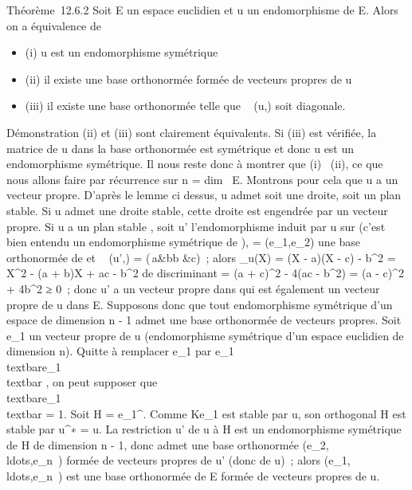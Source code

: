 \documentclass[]{article}
\begin{document}
Théorème~12.6.2 Soit E un espace euclidien et u un endomorphisme de E.
Alors on a équivalence de

\begin{itemize}
\itemsep1pt\parskip0pt
\item
  (i) u est un endomorphisme symétrique
\item
  (ii) il existe une base orthonormée formée de vecteurs propres de u
\item
  (iii) il existe une base orthonormée  telle que
  \mathrmMat~ (u,) soit
  diagonale.
\end{itemize}

Démonstration (ii) et (iii) sont clairement équivalents. Si (iii) est
vérifiée, la matrice de u dans la base orthonormée  est symétrique et
donc u est un endomorphisme symétrique. Il nous reste donc à montrer que
(i) \rigtharrow~(ii), ce que nous allons faire par récurrence sur n
= dim~ E. Montrons pour cela que u a un vecteur
propre. D'après le lemme ci dessus, u admet soit une droite, soit un
plan stable. Si u admet une droite stable, cette droite est engendrée
par un vecteur propre. Si u a un plan stable \Pi, soit u' l'endomorphisme
induit par u sur \Pi (c'est bien entendu un endomorphisme symétrique de
\Pi),  = (e\_1,e\_2) une base orthonormée de \Pi et
\mathrmMat~ (u',) =
\left
(\matrix\,a&b\cr b
&c\right )~; alors \chi\_u(X) = (X - a)(X - c) -
b^2 = X^2 - (a + b)X + ac - b^2 de
discriminant \Delta = (a + c)^2 - 4(ac - b^2) = (a -
c)^2 + 4b^2 ≥ 0~; donc u' a un vecteur propre dans \Pi
qui est également un vecteur propre de u dans E. Supposons donc que tout
endomorphisme symétrique d'un espace de dimension n - 1 admet une base
orthonormée de vecteurs propres. Soit e\_1 un vecteur propre de
u (endomorphisme symétrique d'un espace euclidien de dimension n).
Quitte à remplacer e\_1 par  e\_1 \over
\\textbar{}e\_1\\textbar{} , on
peut supposer que
\\textbar{}e\_1\\textbar{} = 1.
Soit H = e\_1^\bot. Comme Ke\_1 est stable par u,
son orthogonal H est stable par u^∗ = u. La restriction u' de
u à H est un endomorphisme symétrique de H de dimension n - 1, donc
admet une base orthonormée
(e\_2,\\ldots,e\_n~)
formée de vecteurs propres de u' (donc de u)~; alors
(e\_1,\\ldots,e\_n~)
est une base orthonormée de E formée de vecteurs propres de u.
\end{document}
